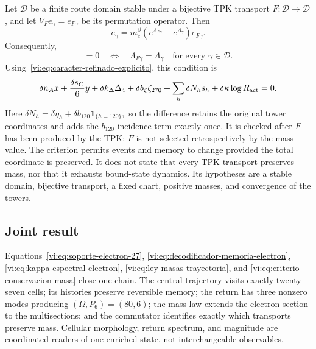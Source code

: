 Let $\mathscr D$ be a finite route domain stable under a bijective TPK
transport $F:\mathscr D\to\mathscr D$, and let
$V_Fe_\gamma=e_{F\gamma}$ be its permutation operator. Then
\begin{equation}
 [M^\beta,V_F]e_\gamma
 =m_e^\beta\left(e^{\Lambda_{F\gamma}}-e^{\Lambda_\gamma}\right)
 e_{F\gamma}.
 \label{vi:eq:conmutador-masa-transporte}
\end{equation}
Consequently,
\begin{equation}
 [M^\beta,V_F]=0
 \quad\Longleftrightarrow\quad
 \Lambda_{F\gamma}=\Lambda_\gamma
 \quad\text{for every }\gamma\in\mathscr D.
 \label{vi:eq:criterio-conservacion-masa}
\end{equation}
Using~\eqref{vi:eq:caracter-refinado-explicito}, this condition is
\begin{equation}
 \delta n_Ax+\frac{\delta s_C}{6}y
 +\delta k_\Delta\Delta_4+\delta b_\zeta\zeta_{270}
 +\sum_h\delta N_hs_h
 +\delta\kappa\log R_{\rm act}=0.
 \label{vi:eq:balance-conservacion-masa}
\end{equation}
Here
\(
 \delta N_h=\delta\eta_h+
 \delta b_{120}\mathbf1_{\{h=120\}},
\)
so the difference retains the original tower coordinates and adds the
$b_{120}$ incidence term exactly once.
It is checked after $F$ has been produced by the TPK; $F$ is not selected
retrospectively by the mass value. The criterion permits events and memory to
change provided the total coordinate is preserved. It does not state that
every TPK transport preserves mass, nor that it exhausts bound-state dynamics.
Its hypotheses are a stable domain, bijective transport, a fixed chart,
positive masses, and convergence of the towers.

\subsection{Joint result}

Equations~\eqref{vi:eq:soporte-electron-27},
\eqref{vi:eq:decodificador-memoria-electron},
\eqref{vi:eq:kappa-espectral-electron},
\eqref{vi:eq:ley-masas-trayectoria}, and
\eqref{vi:eq:criterio-conservacion-masa} close one chain. The central
trajectory visits exactly twenty-seven cells; its histories preserve
reversible memory; the return has three nonzero modes producing
$(\Omega,P_6)=(80,6)$; the mass law extends the electron section to the
multisections; and the commutator identifies exactly which transports
preserve mass. Cellular morphology, return spectrum, and magnitude are
coordinated readers of one enriched state, not interchangeable observables.
